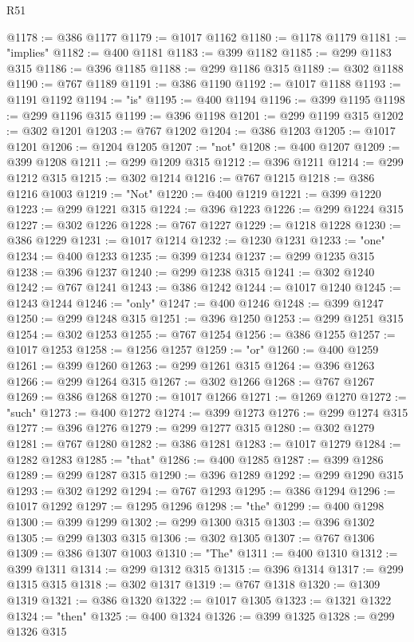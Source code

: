 \begin{lexlean}{R51}
\begin{coremodule}
@1178 := @386 @1177
@1179 := @1017 @1162
@1180 := @1178 @1179
@1181 := "implies"
@1182 := @400 @1181
@1183 := @399 @1182
@1185 := @299 @1183 @315
@1186 := @396 @1185
@1188 := @299 @1186 @315
@1189 := @302 @1188
@1190 := @767 @1189
@1191 := @386 @1190
@1192 := @1017 @1188
@1193 := @1191 @1192
@1194 := "is"
@1195 := @400 @1194
@1196 := @399 @1195
@1198 := @299 @1196 @315
@1199 := @396 @1198
@1201 := @299 @1199 @315
@1202 := @302 @1201
@1203 := @767 @1202
@1204 := @386 @1203
@1205 := @1017 @1201
@1206 := @1204 @1205
@1207 := "not"
@1208 := @400 @1207
@1209 := @399 @1208
@1211 := @299 @1209 @315
@1212 := @396 @1211
@1214 := @299 @1212 @315
@1215 := @302 @1214
@1216 := @767 @1215
@1218 := @386 @1216 @1003
@1219 := "Not"
@1220 := @400 @1219
@1221 := @399 @1220
@1223 := @299 @1221 @315
@1224 := @396 @1223
@1226 := @299 @1224 @315
@1227 := @302 @1226
@1228 := @767 @1227
@1229 := @1218 @1228
@1230 := @386 @1229
@1231 := @1017 @1214
@1232 := @1230 @1231
@1233 := "one"
@1234 := @400 @1233
@1235 := @399 @1234
@1237 := @299 @1235 @315
@1238 := @396 @1237
@1240 := @299 @1238 @315
@1241 := @302 @1240
@1242 := @767 @1241
@1243 := @386 @1242
@1244 := @1017 @1240
@1245 := @1243 @1244
@1246 := "only"
@1247 := @400 @1246
@1248 := @399 @1247
@1250 := @299 @1248 @315
@1251 := @396 @1250
@1253 := @299 @1251 @315
@1254 := @302 @1253
@1255 := @767 @1254
@1256 := @386 @1255
@1257 := @1017 @1253
@1258 := @1256 @1257
@1259 := "or"
@1260 := @400 @1259
@1261 := @399 @1260
@1263 := @299 @1261 @315
@1264 := @396 @1263
@1266 := @299 @1264 @315
@1267 := @302 @1266
@1268 := @767 @1267
@1269 := @386 @1268
@1270 := @1017 @1266
@1271 := @1269 @1270
@1272 := "such"
@1273 := @400 @1272
@1274 := @399 @1273
@1276 := @299 @1274 @315
@1277 := @396 @1276
@1279 := @299 @1277 @315
@1280 := @302 @1279
@1281 := @767 @1280
@1282 := @386 @1281
@1283 := @1017 @1279
@1284 := @1282 @1283
@1285 := "that"
@1286 := @400 @1285
@1287 := @399 @1286
@1289 := @299 @1287 @315
@1290 := @396 @1289
@1292 := @299 @1290 @315
@1293 := @302 @1292
@1294 := @767 @1293
@1295 := @386 @1294
@1296 := @1017 @1292
@1297 := @1295 @1296
@1298 := "the"
@1299 := @400 @1298
@1300 := @399 @1299
@1302 := @299 @1300 @315
@1303 := @396 @1302
@1305 := @299 @1303 @315
@1306 := @302 @1305
@1307 := @767 @1306
@1309 := @386 @1307 @1003
@1310 := "The"
@1311 := @400 @1310
@1312 := @399 @1311
@1314 := @299 @1312 @315
@1315 := @396 @1314
@1317 := @299 @1315 @315
@1318 := @302 @1317
@1319 := @767 @1318
@1320 := @1309 @1319
@1321 := @386 @1320
@1322 := @1017 @1305
@1323 := @1321 @1322
@1324 := "then"
@1325 := @400 @1324
@1326 := @399 @1325
@1328 := @299 @1326 @315

\end{coremodule}
\end{lexlean}
